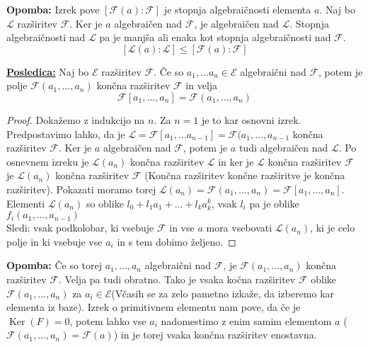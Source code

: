 \documentclass[a4paper]{article}
\newcounter{environment:definition_counter}
\newcounter{environment:theorem_counter}
\newcounter{environment:statement_counter}
\newenvironment{remark}
{\textbf{Opomba:}}
{}
\newenvironment{corollary}
{\underline{\textbf{Posledica:}}}
{}
\renewcommand{\ker}{\ensuremath{\operatorname{Ker}}} %
\begin{document}
\begin{remark}
Izrek pove $[\mathcal{F}(a):\mathcal{F}]$ je stopnja algebraičnosti elementa $a$. Naj bo $\mathcal{L}$ razširitev $\mathcal{F}$. Ker je $a$ algebraičen nad $\mathcal{F}$, je algebraičen nad $\mathcal{L}$. Stopnja algebraičnosti nad $\mathcal{L}$ pa je manjša ali enaka kot stopnja algebraičnosti nad $\mathcal{F}$. $$[\mathcal{L}(a):\mathcal{L}] \leq [\mathcal{F}(a):\mathcal{F}]$$
\end{remark}

\begin{corollary}
Naj bo $\mathcal{E}$ razširitev $\mathcal{F}$. Če so $a_1, \dots a_n \in \mathcal{E}$ algebraični nad $\mathcal{F}$, potem je polje $\mathcal{F}(a_1, \dots, a_n)$ končna razširitev $\mathcal{F}$ in velja $$\mathcal{F}[a_1, \dots, a_n] = \mathcal{F}(a_1, \dots, a_n)$$
\end{corollary}

\begin{proof}
Dokažemo z indukcijo na $n$. Za $n = 1$ je to kar osnovni izrek.\\
Predpostavimo lahko, da je $\mathcal{L} = \mathcal{F}[a_1, \dots a_{n-1}] = \mathcal{F}(a_1, \dots, a_{n-1}$ končna razširitev $\mathcal{F}$. Ker je $a$ algebraičen nad $\mathcal{F}$, potem je $a$ tudi algebraičen nad $\mathcal{L}$. Po osnevnem izreku je $\mathcal{L}(a_n)$ končna razširitev $\mathcal{L}$ in ker je $\mathcal{L}$ končna razširitev $\mathcal{F}$ je $\mathcal{L}(a_n)$ končna razširitev $\mathcal{F}$ (Končna razširitev končne razširitve je končna razširitev). Pokazati moramo torej $\mathcal{L}(a_n) = \mathcal{F}(a_1, \dots, a_n) = \mathcal{F}[a_1, \dots, a_n]$. Elementi $\mathcal{L}(a_n)$ so oblike $l_0 + l_1a_1 + \dots + l_ka_{k}^k$, vsak $l_i$ pa je oblike $f_i(a_1, \dots, a_{n-1})$ \\
Sledi: vsak podkolobar, ki vsebuje $\mathcal{F}$ in vse $a$ mora vsebovati $\mathcal{L}(a_n)$, ki je celo polje in ki vsebuje vse $a_i$ in s tem dobimo željeno.

\end{proof}

\begin{remark}
Če so torej $a_1, \dots, a_n$ algebraični nad $\mathcal{F}$, je $\mathcal{F}(a_1, \dots, a_n)$ končna razširitev $\mathcal{F}$. Velja pa tudi obratno. Tako je vsaka kočna razširitev $\mathcal{F}$ oblike $\mathcal{F}(a_1, \dots, a_n)$ za $a_i \in \mathcal{E}$(Včasih se za zelo pametno izkaže, da izberemo kar elementa iz baze). Izrek o primitivnem elementu nam pove, da če je $\ker(F) = 0$, potem lahko vse $a_i$ nadomestimo z enim samim elementom $a$ ($\mathcal{F}(a_1, \dots, a_n) = \mathcal{F}(a)$) in je torej vsaka končna razširitev enostavna. 
\end{remark}
\end{document}
